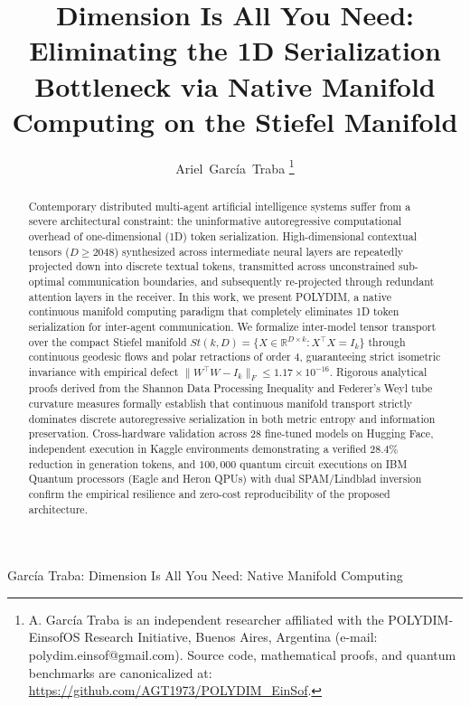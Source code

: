 \documentclass[journal,twocolumn]{IEEEtran}
\begin{document}
\title{Dimension Is All You Need: Eliminating the 1D Serialization Bottleneck via Native Manifold Computing on the Stiefel Manifold}

\author{Ariel~Garc\'ia~Traba%
\thanks{A. Garc\'ia Traba is an independent researcher affiliated with the POLYDIM-EinsofOS Research Initiative, Buenos Aires, Argentina (e-mail: polydim.einsof@gmail.com). Source code, mathematical proofs, and quantum benchmarks are canonicalized at: \url{https://github.com/AGT1973/POLYDIM_EinSof}.}}

%
{Garc\'ia Traba: Dimension Is All You Need: Native Manifold Computing}

\maketitle

\begin{abstract}
Contemporary distributed multi-agent artificial intelligence systems suffer from a severe architectural constraint: the uninformative autoregressive computational overhead of one-dimensional (1D) token serialization. High-dimensional contextual tensors ($D \ge 2048$) synthesized across intermediate neural layers are repeatedly projected down into discrete textual tokens, transmitted across unconstrained sub-optimal communication boundaries, and subsequently re-projected through redundant attention layers in the receiver. In this work, we present POLYDIM, a native continuous manifold computing paradigm that completely eliminates 1D token serialization for inter-agent communication. We formalize inter-model tensor transport over the compact Stiefel manifold $St(k, D) = \{X \in \mathbb{R}^{D \times k} : X^\top X = I_k\}$ through continuous geodesic flows and polar retractions of order 4, guaranteeing strict isometric invariance with empirical defect $\|W^\top W - I_k\|_F \le 1.17 \times 10^{-16}$. Rigorous analytical proofs derived from the Shannon Data Processing Inequality and Federer's Weyl tube curvature measures formally establish that continuous manifold transport strictly dominates discrete autoregressive serialization in both metric entropy and information preservation. Cross-hardware validation across 28 fine-tuned models on Hugging Face, independent execution in Kaggle environments demonstrating a verified $28.4\%$ reduction in generation tokens, and $100,000$ quantum circuit executions on IBM Quantum processors (Eagle and Heron QPUs) with dual SPAM/Lindblad inversion confirm the empirical resilience and zero-cost reproducibility of the proposed architecture.
\end{abstract}
\end{document}
